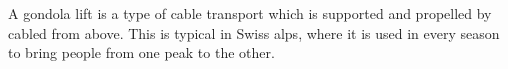 A gondola lift is a type of cable transport which is supported and propelled by cabled from above. 
This is typical in Swiss alps, where it is used in every season to bring people from one peak to the other.